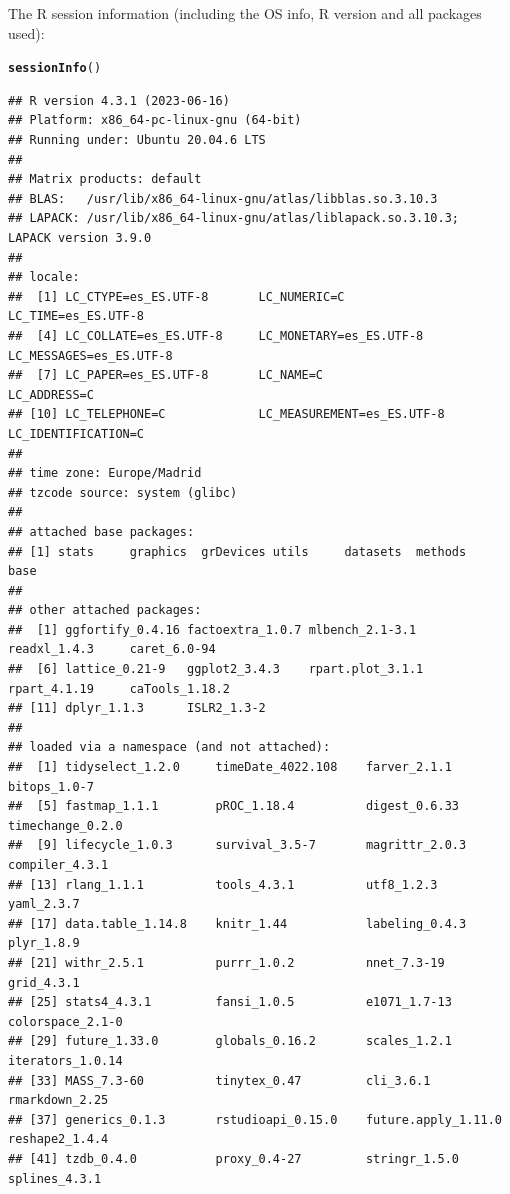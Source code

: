 \documentclass{article}\usepackage[]{graphicx}\usepackage[]{xcolor}
\makeatletter
\newcommand{\hlstd}[1]{\textcolor[rgb]{0.345,0.345,0.345}{#1}}%
\newcommand{\hlkwd}[1]{\textcolor[rgb]{0.737,0.353,0.396}{\textbf{#1}}}%
\newenvironment{kframe}{%
 \def\at@end@of@kframe{}%
 \ifinner\ifhmode%
  \def\at@end@of@kframe{\end{minipage}}%
  \begin{minipage}{\columnwidth}%
 \fi\fi%
 \def\FrameCommand##1{\hskip\@totalleftmargin \hskip-\fboxsep
 \colorbox{shadecolor}{##1}\hskip-\fboxsep
     \hskip-\linewidth \hskip-\@totalleftmargin \hskip\columnwidth}%
 \MakeFramed {\advance\hsize-\width
   \@totalleftmargin\z@ \linewidth\hsize
   \@setminipage}}%
 {\par\unskip\endMakeFramed%
 \at@end@of@kframe}
\newenvironment{knitrout}{}{} %
\makeatother
\begin{document}
The R session information (including the OS info, R version and all
packages used):

\begin{knitrout}
\color{fgcolor}\begin{kframe}
\begin{alltt}
\hlkwd{sessionInfo}\hlstd{()}
\end{alltt}
\begin{verbatim}
## R version 4.3.1 (2023-06-16)
## Platform: x86_64-pc-linux-gnu (64-bit)
## Running under: Ubuntu 20.04.6 LTS
## 
## Matrix products: default
## BLAS:   /usr/lib/x86_64-linux-gnu/atlas/libblas.so.3.10.3 
## LAPACK: /usr/lib/x86_64-linux-gnu/atlas/liblapack.so.3.10.3;  LAPACK version 3.9.0
## 
## locale:
##  [1] LC_CTYPE=es_ES.UTF-8       LC_NUMERIC=C               LC_TIME=es_ES.UTF-8       
##  [4] LC_COLLATE=es_ES.UTF-8     LC_MONETARY=es_ES.UTF-8    LC_MESSAGES=es_ES.UTF-8   
##  [7] LC_PAPER=es_ES.UTF-8       LC_NAME=C                  LC_ADDRESS=C              
## [10] LC_TELEPHONE=C             LC_MEASUREMENT=es_ES.UTF-8 LC_IDENTIFICATION=C       
## 
## time zone: Europe/Madrid
## tzcode source: system (glibc)
## 
## attached base packages:
## [1] stats     graphics  grDevices utils     datasets  methods   base     
## 
## other attached packages:
##  [1] ggfortify_0.4.16 factoextra_1.0.7 mlbench_2.1-3.1  readxl_1.4.3     caret_6.0-94    
##  [6] lattice_0.21-9   ggplot2_3.4.3    rpart.plot_3.1.1 rpart_4.1.19     caTools_1.18.2  
## [11] dplyr_1.1.3      ISLR2_1.3-2     
## 
## loaded via a namespace (and not attached):
##  [1] tidyselect_1.2.0     timeDate_4022.108    farver_2.1.1         bitops_1.0-7        
##  [5] fastmap_1.1.1        pROC_1.18.4          digest_0.6.33        timechange_0.2.0    
##  [9] lifecycle_1.0.3      survival_3.5-7       magrittr_2.0.3       compiler_4.3.1      
## [13] rlang_1.1.1          tools_4.3.1          utf8_1.2.3           yaml_2.3.7          
## [17] data.table_1.14.8    knitr_1.44           labeling_0.4.3       plyr_1.8.9          
## [21] withr_2.5.1          purrr_1.0.2          nnet_7.3-19          grid_4.3.1          
## [25] stats4_4.3.1         fansi_1.0.5          e1071_1.7-13         colorspace_2.1-0    
## [29] future_1.33.0        globals_0.16.2       scales_1.2.1         iterators_1.0.14    
## [33] MASS_7.3-60          tinytex_0.47         cli_3.6.1            rmarkdown_2.25      
## [37] generics_0.1.3       rstudioapi_0.15.0    future.apply_1.11.0  reshape2_1.4.4      
## [41] tzdb_0.4.0           proxy_0.4-27         stringr_1.5.0        splines_4.3.1       

\end{verbatim}
\end{kframe}
\end{knitrout}
\end{document}
